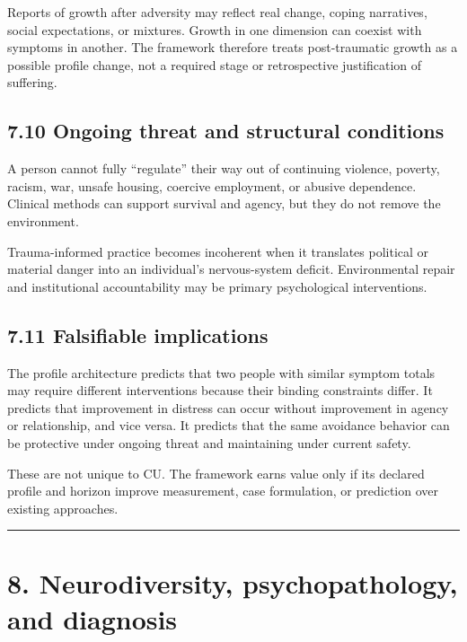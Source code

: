 \documentclass[
  11pt,
]{article}
\begin{document}
Reports of growth after adversity may reflect real change, coping
narratives, social expectations, or mixtures. Growth in one dimension
can coexist with symptoms in another. The framework therefore treats
post-traumatic growth as a possible profile change, not a required stage
or retrospective justification of suffering.

\subsection{7.10 Ongoing threat and structural
conditions}\label{ongoing-threat-and-structural-conditions}

A person cannot fully ``regulate'' their way out of continuing violence,
poverty, racism, war, unsafe housing, coercive employment, or abusive
dependence. Clinical methods can support survival and agency, but they
do not remove the environment.

Trauma-informed practice becomes incoherent when it translates political
or material danger into an individual's nervous-system deficit.
Environmental repair and institutional accountability may be primary
psychological interventions.

\subsection{7.11 Falsifiable
implications}\label{falsifiable-implications}

The profile architecture predicts that two people with similar symptom
totals may require different interventions because their binding
constraints differ. It predicts that improvement in distress can occur
without improvement in agency or relationship, and vice versa. It
predicts that the same avoidance behavior can be protective under
ongoing threat and maintaining under current safety.

These are not unique to CU. The framework earns value only if its
declared profile and horizon improve measurement, case formulation, or
prediction over existing approaches.

\begin{center}\rule{0.5\linewidth}{0.5pt}\end{center}

\section{8. Neurodiversity, psychopathology, and
diagnosis}\label{neurodiversity-psychopathology-and-diagnosis}
\end{document}
